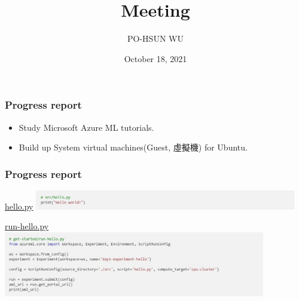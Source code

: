 \documentclass{beamer}
\date{October 18, 2021}
\title{Meeting}
\author{PO-HSUN WU}
\begin{document}
    \frame{\titlepage}

    \begin{frame}
        \frametitle{Progress report}
        \begin{itemize}
            \item Study Microsoft Azure ML tutorials.
            \item Build up System virtual machines(Guest, 虛擬機) for Ubuntu.
        \end{itemize}
    \end{frame}

    \begin{frame}
        \frametitle{Progress report}

        \begin{block}{\href{https://docs.microsoft.com/en-us/azure/machine-learning/tutorial-1st-experiment-hello-world}{hello.py}}
            \centering
            \includegraphics[width=4.5in]{./Fig/hello.jpg}
        \end{block}

        \begin{block}{\href{https://docs.microsoft.com/en-us/azure/machine-learning/tutorial-1st-experiment-hello-world}{run-hello.py}}
            \centering
            \includegraphics[width=4.5in]{./Fig/run_hello.jpg}
        \end{block}
    \end{frame}
\end{document}
